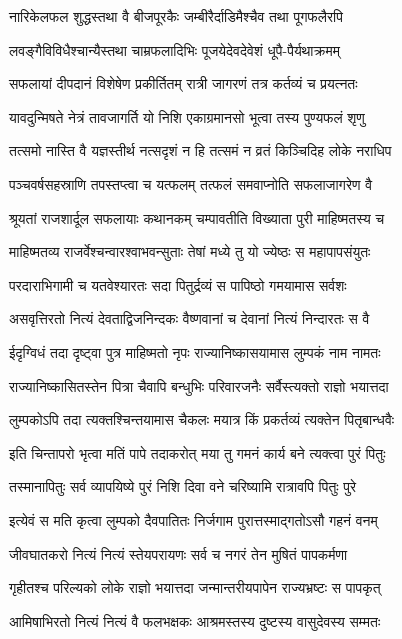 \twolineshloka
{नारिकेलफल शुद्धस्तथा वै बीजपूरकैः}
{जम्बीरैर्दाडिमैश्चैव तथा पूगफलैरपि} %

\twolineshloka
{लवङ्गैविविधैश्चान्यैस्तथा चाम्रफलादिभिः}
{पूजयेदेवदेवेशं धूपै-पैर्यथाक्रमम्} %

\twolineshloka
{सफलायां दीपदानं विशेषेण प्रकीर्तितम्}
{रात्री जागरणं तत्र कर्तव्यं च प्रयत्नतः} %

\twolineshloka
{यावदुन्मिषते नेत्रं तावजागर्ति यो निशि}
{एकाग्रमानसो भूत्वा तस्य पुण्यफलं शृणु} %

\twolineshloka
{तत्समो नास्ति वै यज्ञस्तीर्थ नत्सदृशं न हि}
{तत्समं न व्रतं किञ्चिदिह लोके नराधिप} %

\twolineshloka
{पञ्चवर्षसहस्राणि तपस्तप्त्वा च यत्फलम्}
{तत्फलं समवाप्नोति सफलाजागरेण वै} %

\twolineshloka
{श्रूयतां राजशार्दूल सफलायाः कथानकम्}
{चम्पावतीति विख्याता पुरी माहिष्मतस्य च} %

\twolineshloka
{माहिष्मतव्य राजर्वेश्चन्वारश्वाभवन्सुताः}
{तेषां मध्ये तु यो ज्येष्ठः स महापापसंयुतः} %

\twolineshloka
{परदाराभिगामी च यतवेश्यारतः सदा}
{पितुर्द्रव्यं स पापिष्ठो गमयामास सर्वशः} %

\twolineshloka
{असवृत्तिरतो नित्यं देवताद्विजनिन्दकः}
{वैष्णवानां च देवानां नित्यं निन्दारतः स वै} %

\twolineshloka
{ईदृग्विधं तदा दृष्ट्वा पुत्र माहिष्मतो नृपः}
{राज्यानिष्कासयामास लुम्पकं नाम नामतः} %

\twolineshloka
{राज्यानिष्कासितस्तेन पित्रा चैवापि बन्धुभिः}
{परिवारजनैः सर्वैस्त्यक्तो राज्ञो भयात्तदा} %

\twolineshloka
{लुम्पकोऽपि तदा त्यक्तश्चिन्तयामास चैकलः}
{मयात्र किं प्रकर्तव्यं त्यक्तेन पितृबान्धवैः} %

\twolineshloka
{इति चिन्तापरो भृत्वा मतिं पापे तदाकरोत्}
{मया तु गमनं कार्य बने त्यक्त्वा पुरं पितुः} %

\twolineshloka
{तस्मानापितुः सर्व व्यापयिष्ये पुरं निशि}
{दिवा वने चरिष्यामि रात्रावपि पितुः पुरे} %

\twolineshloka
{इत्येवं स मति कृत्वा लुम्पको दैवपातितः}
{निर्जगाम पुरात्तस्माद्गतोऽसौ गहनं वनम्} %

\twolineshloka
{जीवघातकरो नित्यं नित्यं स्तेयपरायणः}
{सर्व च नगरं तेन मुषितं पापकर्मणा} %

\twolineshloka
{गृहीतश्च परिल्यको लोके राज्ञो भयात्तदा}
{जन्मान्तरीयपापेन राज्यभ्रष्टः स पापकृत्} %

\twolineshloka
{आमिषाभिरतो नित्यं नित्यं वै फलभक्षकः}
{आश्रमस्तस्य दुष्टस्य वासुदेवस्य सम्मतः} %

